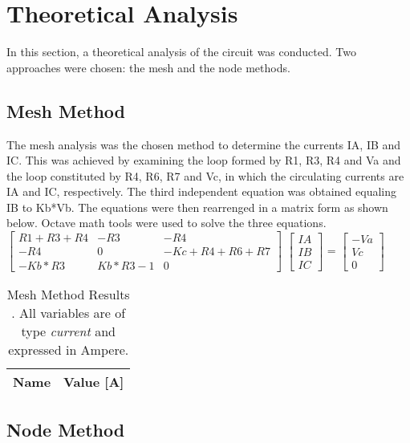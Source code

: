 

\section {Theoretical Analysis}
\label{analysis}

In this section, a theoretical analysis of the circuit was conducted. Two approaches were chosen: the mesh and the node methods.



\subsection{Mesh Method}
The mesh analysis was the chosen method to determine the currents IA, IB and IC. This was achieved by examining the loop formed by R1, R3, R4 and Va and the loop constituted by R4, R6, R7 and Vc, in which the circulating currents are IA and IC, respectively. The third independent equation was obtained equaling IB to Kb*Vb. The equations were then rearrenged in a matrix form as shown below. Octave math tools were used to solve the three equations.\\

$\begin{bmatrix}
R1+R3+R4 & -R3 & -R4\\
   
-R4 & 0 & -Kc+R4+R6+R7\\

-Kb*R3 & Kb*R3-1 & 0
\end{bmatrix}$
$\begin{bmatrix}
IA\\
IB\\
IC
\end{bmatrix}$
= 
$\begin{bmatrix}
-Va\\
Vc\\
0
\end{bmatrix}$

\begin{table}[h]
  \centering
  \begin{tabular}{|l|r|}
    \hline    
    {\bf Name} & {\bf Value [A]} \\ \hline
    
  \end{tabular}
  \caption{Mesh Method Results . All variables are of type {\em current}
    and expressed in Ampere.}
  \label{tab:malhas}
\end{table}


\subsection{Node Method}


